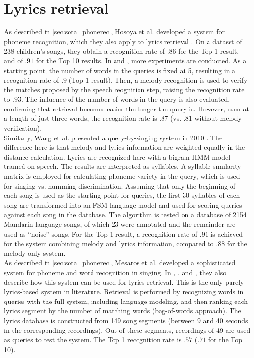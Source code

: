 \section{Lyrics retrieval}
As described in \ref{sec:sota_phonerec}, Hosoya et al. developed a system for phoneme recognition, which they also apply to lyrics retrieval \cite{Hosoya2005}. On a dataset of 238 children's songs, they obtain a recognition rate of $.86$ for the Top 1 result, and of $.91$ for the Top 10 results. In \cite{suzuki06} and \cite{suzuki07}, more experiments are conducted. As a starting point, the number of words in the queries is fixed at 5, resulting in a recognition rate of $.9$ (Top 1 result). Then, a melody recognition is used to verify the matches proposed by the speech reognition step, raising the recognition rate to $.93$. The influence of the number of words in the query is also evaluated, confirming that retrieval becomes easier the longer the query is. However, even at a length of just three words, the recognition rate is $.87$ (vs. $.81$ without melody verification).\\

Similarly, Wang et al. presented a query-by-singing system in 2010 \cite{Wang2010}. The difference here is that melody and lyrics information are weighted equally in the distance calculation. Lyrics are recognized here with a bigram HMM model trained on speech. The results are interpreted as syllables. A syllable similarity matrix is employed for calculating phoneme variety in the query, which is used for singing vs. humming discrimination. Assuming that only the beginning of each song is used as the starting point for queries, the first 30 syllables of each song are transformed into an FSM language model and used for scoring queries against each song in the database. The algorithm is tested on a database of 2154 Mandarin-language songs, of which 23 were annotated and the remainder are used as ``noise'' songs. For the Top 1 result, a recognition rate of $.91$ is achieved for the system combining melody and lyrics information, compared to $.88$ for the melody-only system.\\

As described in \ref{sec:sota_phonerec}, Mesaros et al. developed a sophisticated system for phoneme and word recognition in singing. In \cite{mesaros1}, \cite{mesaros2}, and \cite{Mesaros2011}, they also describe how this system can be used for lyrics retrieval. This is the only purely lyrics-based system in literature. Retrieval is performed by recognizing words in queries with the full system, including language modeling, and then ranking each lyrics segment by the number of matching words (bag-of-words approach). The lyrics database is constructed from 149 song segments (between 9 and 40 seconds in the corresponding recordings). Out of these segments, recordings of 49 are used as queries to test the system. The Top 1 recognition rate is $.57$ ($.71$ for the Top 10).


